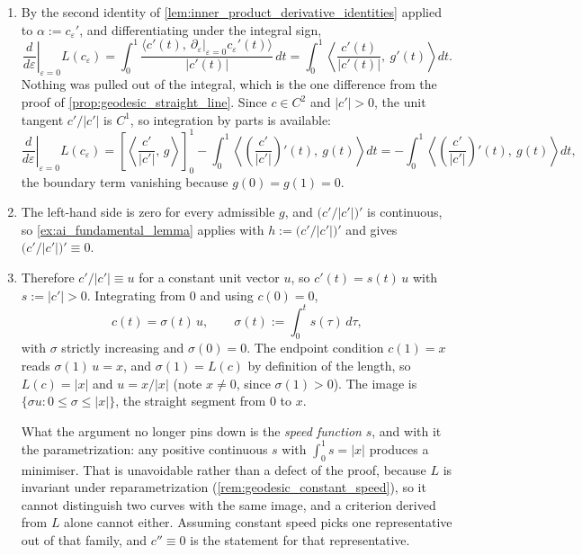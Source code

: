 \begin{exercisesolution}
\label{sol:ai_variation_without_constant_speed}
\begin{enumerate}[label=\textbf{(\alph*)}]
  \item By the second identity of \cref{lem:inner_product_derivative_identities} applied to
    $\alpha := c_\varepsilon'$, and differentiating under the integral sign,
    \[\left.\frac{d}{d\varepsilon}\right|_{\varepsilon=0} L(c_\varepsilon)
      = \int_0^1 \frac{\big\langle c'(t),\ \partial_\varepsilon\big|_{\varepsilon=0}
        c_\varepsilon'(t)\big\rangle}{\lvert c'(t)\rvert}\,dt
      = \int_0^1 \left\langle \frac{c'(t)}{\lvert c'(t)\rvert},\ g'(t)\right\rangle dt.\]
    Nothing was pulled out of the integral, which is the one difference from the proof of
    \cref{prop:geodesic_straight_line}. Since $c \in C^2$ and $\lvert c'\rvert > 0$, the unit
    tangent $c'/\lvert c'\rvert$ is $C^1$, so integration by parts is available:
    \[\left.\frac{d}{d\varepsilon}\right|_{\varepsilon=0} L(c_\varepsilon)
      = \left[\left\langle \frac{c'}{\lvert c'\rvert},\,g\right\rangle\right]_0^1
        - \int_0^1 \left\langle \left(\frac{c'}{\lvert c'\rvert}\right)'(t),\ g(t)\right\rangle dt
      = -\int_0^1 \left\langle \left(\frac{c'}{\lvert c'\rvert}\right)'(t),\ g(t)\right\rangle dt,\]
    the boundary term vanishing because $g(0) = g(1) = 0$.
  \item The left-hand side is zero for every admissible $g$, and
    $\big(c'/\lvert c'\rvert\big)'$ is continuous, so \cref{ex:ai_fundamental_lemma} applies with
    $h := \big(c'/\lvert c'\rvert\big)'$ and gives $\big(c'/\lvert c'\rvert\big)' \equiv 0$.
  \item Therefore $c'/\lvert c'\rvert \equiv u$ for a constant unit vector $u$, so
    $c'(t) = s(t)\,u$ with $s := \lvert c'\rvert > 0$. Integrating from $0$ and using $c(0)=0$,
    \[c(t) = \sigma(t)\,u, \qquad \sigma(t) := \int_0^t s(\tau)\,d\tau,\]
    with $\sigma$ strictly increasing and $\sigma(0) = 0$. The endpoint condition $c(1) = x$
    reads $\sigma(1)\,u = x$, and $\sigma(1) = L(c)$ by definition of the length, so
    $L(c) = \lvert x\rvert$ and $u = x/\lvert x\rvert$ (note $x \neq 0$, since $\sigma(1) > 0$).
    The image is $\{\sigma u : 0 \leq \sigma \leq \lvert x\rvert\}$, the straight segment from
    $0$ to $x$.

    What the argument no longer pins down is the \emph{speed function} $s$, and with it the
    parametrization: any positive continuous $s$ with $\int_0^1 s = \lvert x\rvert$ produces a
    minimiser. That is unavoidable rather than a defect of the proof, because $L$ is invariant
    under reparametrization (\cref{rem:geodesic_constant_speed}), so it cannot distinguish two
    curves with the same image, and a criterion derived from $L$ alone cannot either. Assuming
    constant speed picks one representative out of that family, and $c'' \equiv 0$ is the
    statement for that representative.
\end{enumerate}
\end{exercisesolution}


